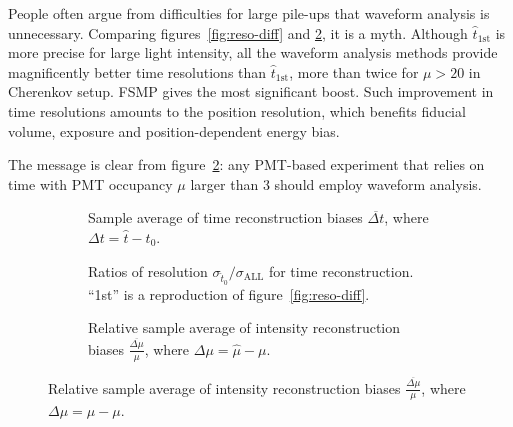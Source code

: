 People often argue from difficulties for large pile-ups that waveform analysis is unnecessary.  Comparing figures~\ref{fig:reso-diff} and \ref{fig:deltamethods}, it is a myth.  Although $\hat{t}_\mathrm{1st}$ is more precise for large light intensity, all the waveform analysis methods provide magnificently better time resolutions than $\hat{t}_\mathrm{1st}$, more than twice for $\mu>20$ in Cherenkov setup.  FSMP gives the most significant boost.  Such improvement in time resolutions amounts to the position resolution, which benefits fiducial volume, exposure and position-dependent energy bias.

The message is clear from figure~\ref{fig:deltamethods}: any PMT-based experiment that relies on time with PMT occupancy $\mu$ larger than 3 should employ waveform analysis.

\begin{figure}[H]
  \begin{subfigure}[b]{\textwidth}
    \centering
    \resizebox{\textwidth}{!}{}
    \caption{\label{fig:biasmethods} Sample average of time reconstruction biases $\overline{\Delta t}$, where $\Delta t = \hat{t} - t_0$.}
  \end{subfigure}

  \vspace{0.5em}
  \begin{subfigure}[b]{\textwidth}
    \centering
    \resizebox{\textwidth}{!}{}
    \caption{\label{fig:deltamethods} Ratios of resolution $\sigma_{\hat{t}_0}/\sigma_{\mathrm{ALL}}$ for time reconstruction. ``1st'' is a reproduction of figure~\ref{fig:reso-diff}.}
  \end{subfigure}

  \vspace{0.5em}
  \begin{subfigure}[b]{\textwidth}
    \centering
    \resizebox{\textwidth}{!}{}
    \caption{\label{fig:biasmu} Relative sample average of intensity reconstruction biases $\frac{\overline{\Delta \mu}}{\mu}$, where $\Delta \mu = \hat{\mu} - \mu$.}
  \end{subfigure}


\end{figure}
